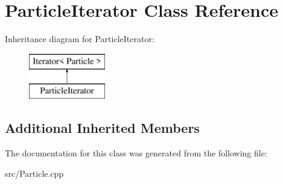 \hypertarget{class_particle_iterator}{}\section{Particle\+Iterator Class Reference}
\label{class_particle_iterator}
Inheritance diagram for Particle\+Iterator\+:\begin{figure}[H]
\begin{center}
\leavevmode
\includegraphics[height=2.000000cm]{class_particle_iterator}
\end{center}
\end{figure}
\subsection*{Additional Inherited Members}


The documentation for this class was generated from the following file\+:\begin{DoxyCompactItemize}
\item 
src/Particle.\+cpp\end{DoxyCompactItemize}
